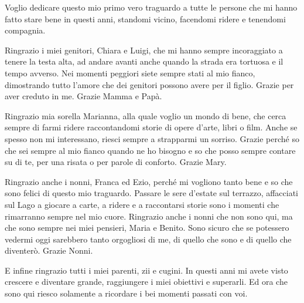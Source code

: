 \newenvironment{dedication}
    {
    \clearpage %
    \thispagestyle{empty} %
    \vspace*{\stretch{1}} %
    \begin{center}\begin{em}}
    {\end{em}\end{center}
    \vspace*{\stretch{2}} %
    \clearpage %
    }


\begin{dedication}


  Voglio dedicare questo mio primo vero traguardo a tutte le persone che mi hanno fatto stare bene in questi anni, standomi vicino, facendomi ridere e tenendomi compagnia. 

  \vspace{1cm}

  Ringrazio i miei genitori, Chiara e Luigi, che mi hanno sempre incoraggiato a tenere la testa alta, ad andare avanti anche quando la strada era tortuosa e il tempo avverso. Nei momenti peggiori siete sempre stati al mio fianco, dimostrando tutto l'amore che dei genitori possono avere per il figlio. Grazie per aver creduto in me. Grazie Mamma e Papà.

  Ringrazio mia sorella Marianna, alla quale voglio un mondo di bene, che cerca sempre di farmi ridere raccontandomi storie di opere d'arte, libri o film. Anche se spesso non mi interessano, riesci sempre a strapparmi un sorriso. Grazie perché so che sei sempre al mio fianco quando ne ho bisogno e so che posso sempre contare su di te, per una risata o per parole di conforto. Grazie Mary.

  Ringrazio anche i nonni, Franca ed Ezio, perché mi vogliono tanto bene e so che sono felici di questo mio traguardo. Passare le sere d'estate sul terrazzo, affacciati sul Lago a giocare a carte, a ridere e a raccontarsi storie sono i momenti che rimarranno sempre nel mio cuore. Ringrazio anche i nonni che non sono qui, ma che sono sempre nei miei pensieri, Maria e Benito. Sono sicuro che se potessero vedermi oggi sarebbero tanto orgogliosi di me, di quello che sono e di quello che diventerò. Grazie Nonni.

  E infine ringrazio tutti i miei parenti, zii e cugini. In questi anni mi avete visto crescere e diventare grande, raggiungere i miei obiettivi e superarli. Ed ora che sono qui riesco solamente a ricordare i bei momenti passati con voi. 
  

\end{dedication}
